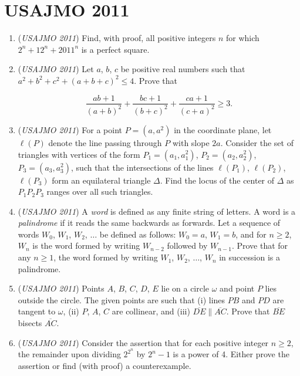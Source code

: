 \section{USAJMO 2011}
        \begin{enumerate}
        	\item (\textit{USAJMO 2011}) Find, with proof, all positive integers $n$ for which $2^n + 12^n + 2011^n$ is a perfect square.


 

	\item (\textit{USAJMO 2011}) Let $a$, $b$, $c$ be positive real numbers such that $a^2 + b^2 + c^2 + (a + b + c)^2 \le 4$.  Prove that

 \[\frac{ab + 1}{(a + b)^2} + \frac{bc + 1}{(b + c)^2} + \frac{ca + 1}{(c + a)^2} \ge 3.\]


	\item (\textit{USAJMO 2011}) For a point $P = (a,a^2)$ in the coordinate plane, let $\ell(P)$ denote the line passing through $P$ with slope $2a$.  Consider the set of triangles with vertices of the form $P_1 = (a_1, a_1^2)$, $P_2 = (a_2, a_2^2)$, $P_3 = (a_3, a_3^2)$, such that the intersections of the lines $\ell(P_1)$, $\ell(P_2)$, $\ell(P_3)$ form an equilateral triangle $\Delta$.  Find the locus of the center of $\Delta$ as $P_1 P_2 P_3$ ranges over all such triangles.


 

	\item (\textit{USAJMO 2011}) A \textit{word} is defined as any finite string of letters.  A word is a \textit{palindrome} if it reads the same backwards as forwards.  Let a sequence of words $W_0$, $W_1$, $W_2$, $\dots$ be defined as follows: $W_0 = a$, $W_1 = b$, and for $n \ge 2$, $W_n$ is the word formed by writing $W_{n - 2}$ followed by $W_{n - 1}$.  Prove that for any $n \ge 1$, the word formed by writing $W_1$, $W_2$, $\dots$, $W_n$ in succession is a palindrome.


 

	\item (\textit{USAJMO 2011}) Points $A$, $B$, $C$, $D$, $E$ lie on a circle $\omega$ and point $P$ lies outside the circle.  The given points are such that (i) lines $PB$ and $PD$ are tangent to $\omega$, (ii) $P$, $A$, $C$ are collinear, and (iii) $\overline{DE} \parallel \overline{AC}$.  Prove that $\overline{BE}$ bisects $\overline{AC}$.


 

	\item (\textit{USAJMO 2011}) Consider the assertion that for each positive integer $n \ge 2$, the remainder upon dividing $2^{2^n}$ by $2^n - 1$ is a power of 4.  Either prove the assertion or find (with proof) a counterexample.


 

\end{enumerate}